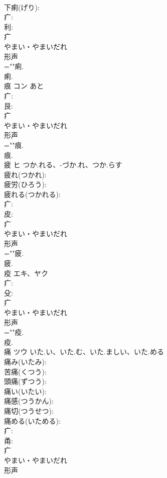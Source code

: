 \documentclass[8pt]{extreport}
\begin{document}
\begin{CJK}{UTF8}{min}
\\	下痢(げり): 
\\	疒: 
\\	利: 
\\	疒	
\\	やまい・やまいだれ	
\\	形声 
\\	=""痢.
\\	痢.
\\	痕	コン	あと		
\\	疒: 
\\	艮: 
\\	疒	
\\	やまい・やまいだれ	
\\	形声 
\\	=""痕.
\\	痕.
\\	疲	ヒ	つか.れる、-づか.れ、つか.らす		
\\	疲れ(つかれ): 
\\	疲労(ひろう): 
\\	疲れる(つかれる): 
\\	疒: 
\\	皮: 
\\	疒	
\\	やまい・やまいだれ	
\\	形声 
\\	=""疲.
\\	疲.
\\	疫	エキ、ヤク			
\\	疒: 
\\	殳: 
\\	疒	
\\	やまい・やまいだれ	
\\	形声 
\\	=""疫.
\\	疫.
\\	痛	ツウ	いた.い、いた.む、いた.ましい、いた.める		
\\	痛み(いたみ): 
\\	苦痛(くつう): 
\\	頭痛(ずつう): 
\\	痛い(いたい): 
\\	痛感(つうかん): 
\\	痛切(つうせつ): 
\\	痛める(いためる): 
\\	疒: 
\\	甬: 
\\	疒	
\\	やまい・やまいだれ	
\\	形声 

\end{CJK}
\end{document}
